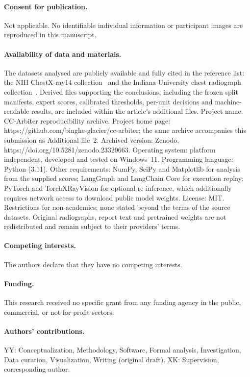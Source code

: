 \documentclass[10pt,a4paper]{article}
\begin{document}
\paragraph{Consent for publication.} Not applicable. No identifiable individual information or participant images are reproduced in this manuscript.
\paragraph{Availability of data and materials.} The datasets analysed are publicly available and fully cited in the reference list: the NIH ChestX-ray14 collection~\cite{nih} and the Indiana University chest radiograph collection~\cite{iu}. Derived files supporting the conclusions, including the frozen split manifests, expert scores, calibrated thresholds, per-unit decisions and machine-readable results, are included within the article's additional files. Project name: CC-Arbiter reproducibility archive. Project home page: https://github.com/binghe-glacier/cc-arbiter; the same archive accompanies this submission as Additional file~2. Archived version: Zenodo, https://doi.org/10.5281/zenodo.23329663. Operating system: platform independent, developed and tested on Windows~11. Programming language: Python (3.11). Other requirements: NumPy, SciPy and Matplotlib for analysis from the supplied scores; LangGraph and LangChain Core for execution replay; PyTorch and TorchXRayVision for optional re-inference, which additionally requires network access to download public model weights. License: MIT. Restrictions for non-academics: none stated beyond the terms of the source datasets. Original radiographs, report text and pretrained weights are not redistributed and remain subject to their providers' terms.
\paragraph{Competing interests.} The authors declare that they have no competing interests.
\paragraph{Funding.} This research received no specific grant from any funding agency in the public, commercial, or not-for-profit sectors.
\paragraph{Authors' contributions.} YY: Conceptualization, Methodology, Software, Formal analysis, Investigation, Data curation, Visualization, Writing (original draft). XK: Supervision, corresponding author.
\end{document}
